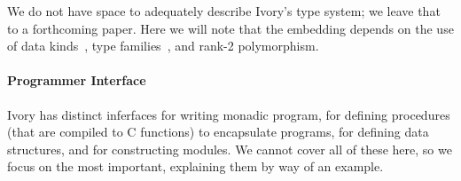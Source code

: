 We do not have space to adequately describe Ivory's type system; we leave that
to a forthcoming paper.  Here we will note that the embedding depends on the use
of data kinds~\cite{datakinds}, type families~\cite{typefamilies}, and rank-2
polymorphism\cite{??}.







\paragraph{Programmer Interface}
Ivory has distinct inferfaces for writing monadic program, for defining
procedures (that are compiled to C functions) to encapsulate programs, for
defining data structures, and for constructing modules.  We cannot cover all of
these here, so we focus on the most important, explaining them by way of an
example.

